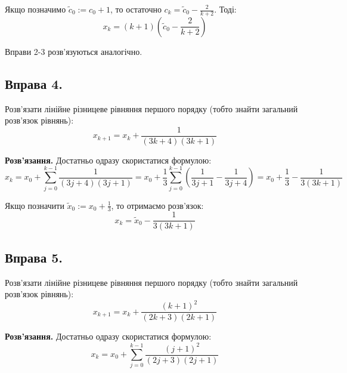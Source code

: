 \documentclass{hw_template}
\begin{document}
Якщо позначимо $\widetilde{c}_0 := c_0 + 1$, то остаточно $c_k = \widetilde{c}_0 - \frac{2}{k+2}$. Тоді:
\begin{equation*}
    x_k = (k+1)\left(\widetilde{c}_0 - \frac{2}{k+2}\right)
\end{equation*}

Вправи 2-3 розв'язуються аналогічно.

\pagebreak

\subsection{Вправа 4.}
\begin{problem}
    Розв'язати лінійне різницеве рівняння першого порядку (тобто знайти загальний розв'язок рівнянь):
    \begin{equation*}
        x_{k+1} = x_k + \frac{1}{(3k+4)(3k+1)}
    \end{equation*}
\end{problem}

\textbf{Розв'язання.} Достатньо одразу скористатися формулою:
\begin{equation*}
    x_k = x_0 + \sum_{j=0}^{k-1} \frac{1}{(3j+4)(3j+1)} = x_0 + \frac{1}{3}\sum_{j=0}^{k-1} \left(\frac{1}{3j+1} - \frac{1}{3j+4}\right) = x_0 + \frac{1}{3} - \frac{1}{3(3k+1)}
\end{equation*}

Якщо позначити $\widetilde{x}_0 := x_0 + \frac{1}{3}$, то отримаємо розв'язок:
\begin{equation*}
    x_k = \widetilde{x}_0 - \frac{1}{3(3k+1)}
\end{equation*}

\subsection{Вправа 5.}
\begin{problem}
    Розв'язати лінійне різницеве рівняння першого порядку (тобто знайти загальний розв'язок рівнянь):
    \begin{equation*}
        x_{k+1} = x_k + \frac{(k+1)^2}{(2k+3)(2k+1)}
    \end{equation*}
\end{problem}

\textbf{Розв'язання.} Достатньо одразу скористатися формулою:
\begin{equation*}
    x_k = x_0 + \sum_{j=0}^{k-1} \frac{(j+1)^2}{(2j+3)(2j+1)}
\end{equation*}
\end{document}
